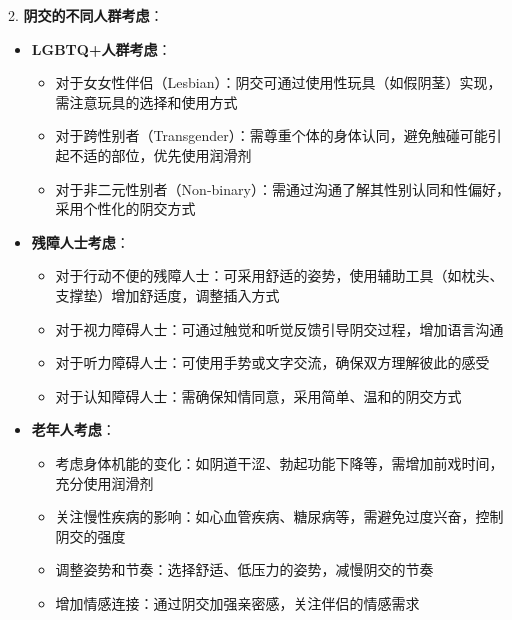 \documentclass[12pt,UTF8]{ctexbook}
\begin{document}
2. \textbf{阴交的不同人群考虑}：
\begin{itemize}
	\item \textbf{LGBTQ+人群考虑}：
	\begin{itemize}
		\item 对于女女性伴侣（Lesbian）：阴交可通过使用性玩具（如假阴茎）实现，需注意玩具的选择和使用方式
		\item 对于跨性别者（Transgender）：需尊重个体的身体认同，避免触碰可能引起不适的部位，优先使用润滑剂
		\item 对于非二元性别者（Non-binary）：需通过沟通了解其性别认同和性偏好，采用个性化的阴交方式
	\end{itemize}
	\item \textbf{残障人士考虑}：
	\begin{itemize}
		\item 对于行动不便的残障人士：可采用舒适的姿势，使用辅助工具（如枕头、支撑垫）增加舒适度，调整插入方式
		\item 对于视力障碍人士：可通过触觉和听觉反馈引导阴交过程，增加语言沟通
		\item 对于听力障碍人士：可使用手势或文字交流，确保双方理解彼此的感受
		\item 对于认知障碍人士：需确保知情同意，采用简单、温和的阴交方式
	\end{itemize}
	\item \textbf{老年人考虑}：
	\begin{itemize}
		\item 考虑身体机能的变化：如阴道干涩、勃起功能下降等，需增加前戏时间，充分使用润滑剂
		\item 关注慢性疾病的影响：如心血管疾病、糖尿病等，需避免过度兴奋，控制阴交的强度
		\item 调整姿势和节奏：选择舒适、低压力的姿势，减慢阴交的节奏
		\item 增加情感连接：通过阴交加强亲密感，关注伴侣的情感需求
	\end{itemize}
\end{itemize}
\end{document}
